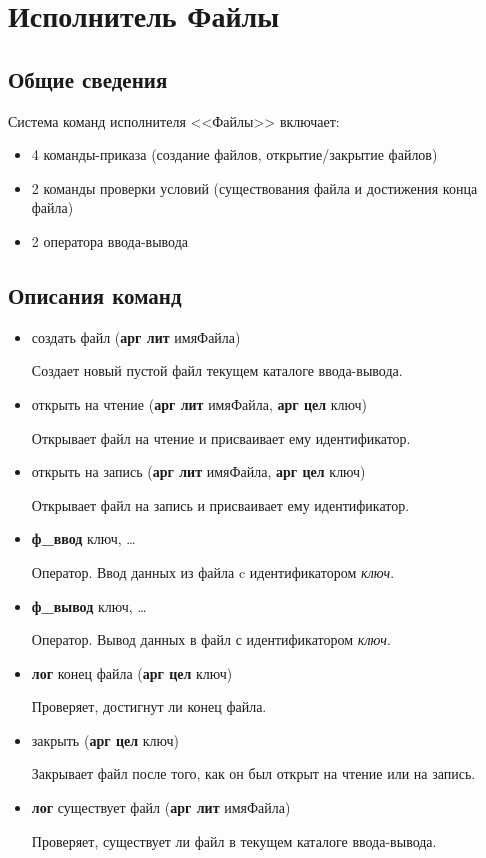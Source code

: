 \documentclass[12pt,a4paper]{article}
\begin{document}
\section{Исполнитель Файлы}

\subsection{Общие сведения}

Система команд исполнителя <<Файлы>> включает:
\begin{itemize}
\item 4 команды-приказа (создание файлов, открытие/закрытие файлов)
\item 2 команды проверки условий (существования файла и достижения конца файла)
\item 2 оператора ввода-вывода
\end{itemize}

\subsection{Описания команд}

\begin{itemize}
\item создать файл (\textbf{арг лит} имяФайла)

Создает новый пустой файл текущем каталоге ввода-вывода.

\item открыть на чтение (\textbf{арг лит} имяФайла, \textbf{арг цел} ключ)

Открывает файл на чтение и присваивает ему идентификатор.

\item открыть на запись (\textbf{арг лит} имяФайла, \textbf{арг цел} ключ)

Открывает файл на запись и присваивает ему идентификатор.

\item \textbf{ф\_ввод} ключ, \dots

Оператор. Ввод данных из файла c идентификатором \emph{ключ}.

\item \textbf{ф\_вывод} ключ, \dots

Оператор. Вывод данных в файл с идентификатором \emph{ключ}.

\item \textbf{лог} конец файла (\textbf{арг цел} ключ)

Проверяет, достигнут ли конец файла.

\item закрыть (\textbf{арг цел} ключ)

Закрывает файл после того, как он был открыт на чтение или на запись.

\item \textbf{лог} существует файл (\textbf{арг лит} имяФайла)

Проверяет, существует ли файл в текущем каталоге ввода-вывода.

\end{itemize}
\end{document}

